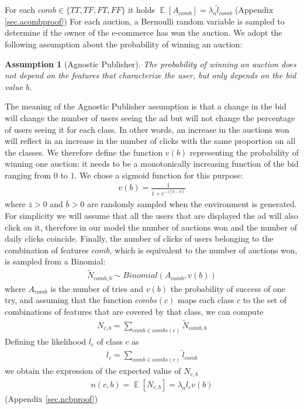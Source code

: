 \documentclass[11pt]{article} %
\DeclareMathOperator{\EX}{\mathbb{E}}
\newtheorem*{assumption}{Assumption}
\begin{document}
For each $comb \in \{TT,TF,FT,FF\}$ it holds $\EX[A_{comb}] = \lambda_a \tilde{l}_{comb}$ (Appendix \ref{sec.acombproof})
\newline
\newline
For each auction, a Bernoulli random variable is sampled to determine if the owner of the e-commerce has won the auction. We adopt the following assumption about the probability of winning an auction:
\begin{assumption}[Agnostic Publisher] The probability of winning an auction does not depend on the features that characterize the user, but only depends on the bid value $b$.
\end{assumption}
The meaning of the Agnostic Publisher assumption is that a change in the bid will change the number of users seeing the ad but will not change the percentage of users seeing it for each class. In other words, an increase in the auctions won will reflect in an increase in the number of clicks with the same proportion on all the classes.
\newline
\newline
We therefore define the function $v(b)$ representing the probability of winning one auction: it needs to be a monotonically increasing function of the bid ranging from $0$ to $1$. We chose a sigmoid function for this purpose:
\begin{align*}
v(b)=\frac{1}{1+e^{-\overline z(b-\overline b)}}
\end{align*}
where $\overline z > 0$ and $\overline b > 0$ are randomly sampled when the environment is generated.
\newline
\newline
For simplicity we will assume that all the users that are displayed the ad will also click on it, therefore in our model the number of auctions won and the number of daily clicks coincide.
\newline
\newline
Finally, the number of clicks of users belonging to the combination of features $comb$, which is equivalent to the number of auctions won, is sampled from a Binomial:
\begin{align*}
\tilde{N}_{comb,b} \sim Binomial(A_{comb}, v(b))
\end{align*}
where $A_{comb}$ is the number of tries and $v(b)$ the probability of success of one try, and assuming that the function $combs(c)$ maps each class $c$ to the set of combinations of features that are covered by that class, we can compute
\begin{align*}
N_{c,b} = \sum_{comb \in combs(c)}{\tilde{N}_{comb,b}}
\end{align*}
Defining the likelihood $l_c$ of class $c$ as 
\begin{align*}
l_c = \sum_{comb \in combs(c)}{\tilde{l}_{comb}}
\end{align*}
we obtain the expression of the expected value of $N_{c,b}$ 
\begin{align*}
n(c,b) = \EX[N_{c,b}] =\lambda_al_{c}v(b)
\end{align*}
 (Appendix \ref{sec.ncbproof})
\end{document}
